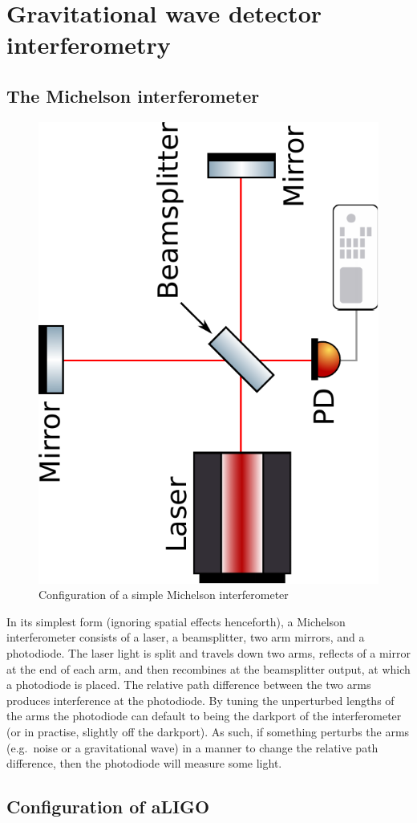 \documentclass[aps,pra,superscriptaddress,reprint,nofootinbib]{revtex4-1}
\begin{document}
\section{Gravitational wave detector interferometry}
\label{sec:gwIFO}

\subsection{The Michelson interferometer}

\begin{figure}
	\begin{center}
	\includegraphics[height=0.35\textwidth,angle=-90]{figures/Michelson_interferometer.pdf}
	\end{center}
	\caption{Configuration of a simple Michelson interferometer}
	\label{fig:Michelson}
\end{figure}

In its simplest form (ignoring spatial effects henceforth), a Michelson interferometer consists of a laser, a beamsplitter, two arm mirrors, and a photodiode. The laser light is split and travels down two arms, reflects of a mirror at the end of each arm, and then recombines at the beamsplitter output, at which a photodiode is placed. The relative path difference between the two arms produces interference at the photodiode. By tuning the unperturbed lengths of the arms the photodiode can default to being the darkport of the interferometer (or in practise, slightly off the darkport). As such, if something perturbs the arms (e.g.\ noise or a gravitational wave) in a manner to change the relative path difference, then the photodiode will measure some light.


\subsection{Configuration of aLIGO}
\end{document}
